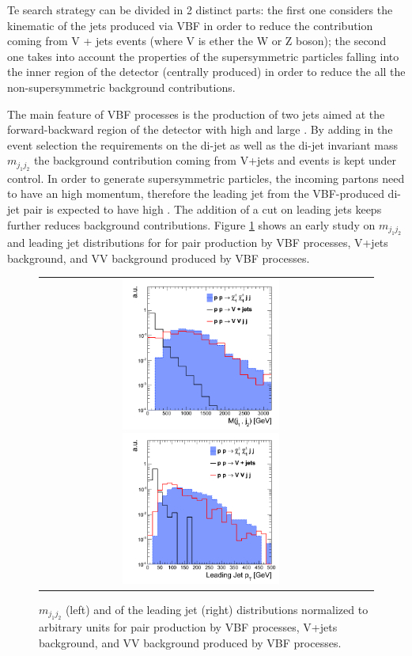 Te search strategy can be divided in 2 distinct parts: the first one considers the kinematic of the jets produced via VBF in order to reduce the contribution coming  from V + jets events (where V is ether the W or Z boson); the second one takes into account the properties of the supersymmetric particles falling into the inner region of the detector (centrally produced) in order to reduce the all the non-supersymmetric background contributions.

The main feature of VBF processes is the production of two jets aimed at the forward-backward region of the detector with high \pt and large \deltaeta. By adding in the event selection the requirements on the di-jet \deltaeta as well as the di-jet invariant mass \ensuremath{m_{j_{1}j_{2}}} the background contribution coming from V+jets and \ttbar events is kept under control. In order to generate supersymmetric particles, the incoming partons need to have an high momentum, therefore the leading jet from the VBF-produced di-jet pair is expected to have high \pt. The addition of a \pt cut on leading jets keeps further reduces background contributions. Figure \ref{fig:VBF_mjj_ptj1} shows an early study on \ensuremath{m_{j_{1}j_{2}}} and leading jet \pt distributions for for \charginopm \charginopm pair production by VBF processes, V+jets background, and VV background produced by VBF processes.

\begin{figure}[tbh!]
	\centering
	\begin{tabular}{cc}
		\includegraphics[width=0.50\textwidth]{analysis/pics/VBFDiJetMass.png}
		\includegraphics[width=0.50\textwidth]{analysis/pics/VBFFirstLeadingJetPt.png} 		
	\end{tabular}
	\caption{\ensuremath{m_{j_{1}j_{2}}} (left) and \pt of the leading jet (right) distributions normalized to arbitrary units for \charginopm \charginopm pair production by VBF processes, V+jets background, and VV background produced by VBF processes.}
	\label{fig:VBF_mjj_ptj1}
\end{figure}


